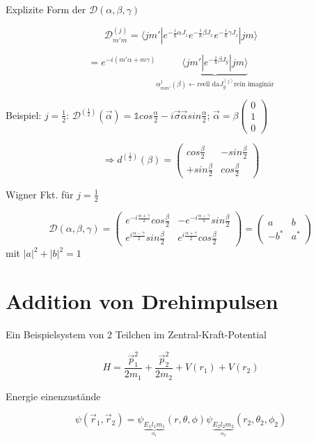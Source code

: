 Explizite Form der \( \mathcal D(\alpha,\beta,\gamma)\)

\[ \mathcal D^{(j)}_{m'm}=\langle jm'|e^{-\frac i \hbar \alpha J_z} e^{-\frac i
  \hbar \beta J_x}e^{-\frac i \hbar \gamma J_z} |jm\rangle\]

\[ = e^{-i(m'\alpha +m\gamma)}\underbrace{\langle jm'|e^{-\frac i \hbar \beta
    J_y}|jm\rangle}_{\alpha^{j}_{mm'}(\beta)\leftarrow\text{reell
    da}J_y^{(j)}\text{rein imaginär}}\]

Beispiel: \(j=\frac 1 2\): \(\mathcal D^{(\frac 1 2)}(\vec \alpha)=\mathbb 1
cos\frac \alpha 2 - i \vec \sigma\vec \alpha sin \frac\alpha 2 \); \(\vec \alpha=\beta\left(\begin{array}{c}0\\1\\0\end{array}\right)\)

\[\Rightarrow d^{(\frac 1 2)}(\beta)=\left(\begin{array}{cc}
cos\frac \beta 2& -sin\frac \beta 2\\
+sin\frac\beta 2& cos\frac \beta 2
\end{array}\right)\]

Wigner Fkt. für \(j=\frac 1 2\)

\[\mathcal D(\alpha,\beta,\gamma)=\left(\begin{array}{cc}
e^{-i\frac{\alpha+\gamma}{2}}cos\frac \beta 2& -e^{-i\frac{\alpha-\gamma}{2}}sin\frac \beta 2\\
e^{i\frac{\alpha-\gamma}{2}}sin\frac\beta 2&e^{i\frac{\alpha+\gamma}{2}} cos\frac \beta 2
\end{array}\right)
=
\left(\begin{array}{cc}
a& b\\
-b^*& a^*
\end{array}\right)
\]
mit \(|a|^2+|b|^2=1\)


\section{Addition von Drehimpulsen}

Ein Beispielsystem von 2 Teilchen im Zentral-Kraft-Potential

\[ H=\frac {\vec p^2_1}{2m_1}+\frac {\vec p^2_2}{2m_2}+V(r_1)+V(r_2)\]

Energie einenzustände

\[ \psi(\vec r_1,\vec
r_2)=\psi_{\underbrace{E_1l_1m_1}_{\alpha_1}}(r,\theta,\phi)\psi_{\underbrace{E_2l_2m_2}_{\alpha_2}}(r_2,\theta_2,\phi_2)\]

